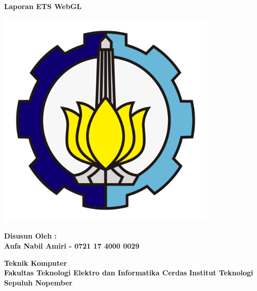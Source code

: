 
\begin{titlepage}
    \begin{center}

        \huge
        \textbf{Laporan ETS WebGL}

        \vfill

        \includegraphics[width=0.8\textwidth]{logo.png}

        \vfill

        \large
        \textbf{Disusun Oleh :}\\
        \textbf{Aufa Nabil Amiri - 0721 17 4000 0029}

        \vspace*{2cm}

        \normalsize
        \textbf{Teknik Komputer}\\
        \textbf{Fakultas Teknologi Elektro dan Informatika Cerdas}
        \textbf{Institut Teknologi Sepuluh Nopember}

    \end{center}
\end{titlepage}